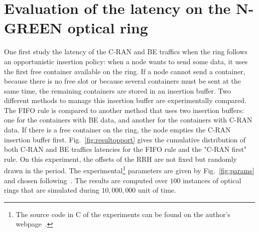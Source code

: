 \documentclass[]{algotel}
\begin{document}
% 
% 
%   

  
   \section{Evaluation of the latency on the N-GREEN optical ring}
   \label{sec:oportmethods}
   
   
  One first study the latency of the C-RAN and BE traffics when the ring follows an opportunistic insertion policy: when a node wants to send some data, it uses the first free container available on the ring. 
  If a node cannot send a container, because there is no free slot or because several containers must be sent at the same time, the remaining containers are stored in an insertion buffer. Two different methods to manage this insertion buffer are experimentally compared. The FIFO rule is compared to another method that uses two insertion buffers: one for the containers with BE data, and another for the containers with C-RAN data. If there is a free container on the ring, the node empties the C-RAN insertion buffer first.  Fig.~\ref{fig:resultopport} gives the cumulative distribution of both C-RAN and BE traffics latencies for the FIFO rule and the "C-RAN first" rule. On this experiment, the offsets of the RRH are not fixed but randomly drawn in the period. The experimental\footnote{The source code in C of the experiments can be found on the author's webpage~\cite{webpage}.} parameters are given by Fig.~\ref{fig:params} and chosen following~\cite{ngreenarchitecture}. The results are computed over $100$ instances of optical rings that are simulated during $10,000,000$ unit of time.
  
\end{document}
